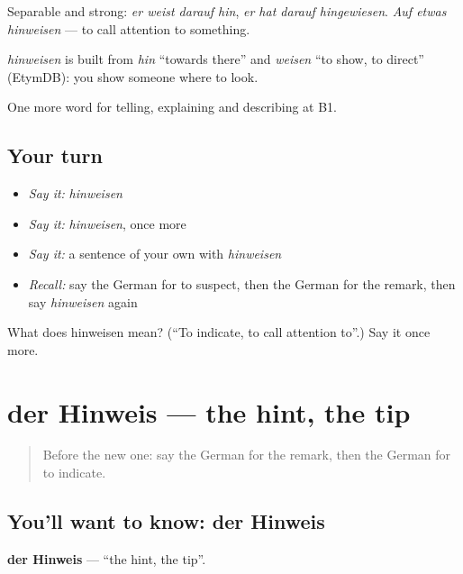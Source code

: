 Separable and strong: \emph{er weist darauf hin}, \emph{er hat darauf hingewiesen}. \emph{Auf etwas hinweisen} — to call attention to something.

\begin{cousinweb}
\emph{hinweisen} is built from \emph{hin} \textquotedblleft{}towards there\textquotedblright{} and \emph{weisen} \textquotedblleft{}to show, to direct\textquotedblright{} (EtymDB): you show someone where to look.
\end{cousinweb}

\begin{grammarlens}[title={What you've built}]
One more word for telling, explaining and describing at B1.
\end{grammarlens}

\subsection*{Your turn}
\begin{itemize}
\raggedright
  \item \emph{Say it:} \emph{hinweisen}
  \item \emph{Say it:} \emph{hinweisen}, once more
  \item \emph{Say it:} a sentence of your own with \emph{hinweisen}
  \item \emph{Recall:} say the German for to suspect, then the German for the remark, then say \emph{hinweisen} again
\end{itemize}

\begin{tcolorbox}[breakable,colback=teal!4,colframe=teal!35!black,title={Before you move on}]
What does hinweisen mean? (\textquotedblleft{}To indicate, to call attention to\textquotedblright{}.) Say it once more.
\end{tcolorbox}
\section[der Hinweis]{der Hinweis — the hint, the tip}

\label{lesson:GE-C339-hinweis}



\begin{quote}
Before the new one: say the German for the remark, then the German for to indicate.
\end{quote}

\subsection*{You'll want to know: der Hinweis}
\textbf{der Hinweis} — \textquotedblleft{}the hint, the tip\textquotedblright{}.

